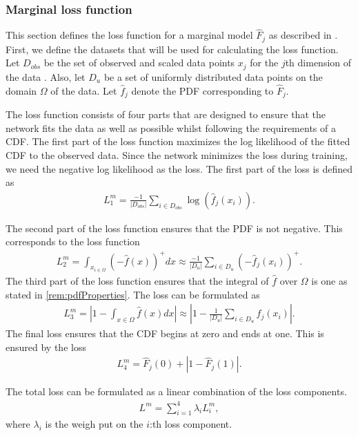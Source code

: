 \subsubsection{Marginal loss function}\label{sec:NeuralMarginalLoss}
This section defines the loss function for a marginal model $\hat{F}_j$ as described in . First, we define the datasets that will be used for calculating the loss function. Let $D_{obs}$ be the set of observed and scaled data points $x_j$ for the $j$th dimension of the data . Also, let $D_u$ be a set of uniformly distributed data points on the domain $\Omega$  of the data. Let $\hat{f}_j$ denote the \gls{PDF} corresponding to $\hat{F}_j$.

The loss function consists of four parts that are designed to ensure that the network fits the data as well as possible whilst following the requirements of a \gls{CDF}. The first part of the loss function maximizes the log likelihood of the fitted \gls{CDF} to the observed data. Since the network minimizes the loss during training, we need the negative log likelihood as the loss. The first part of the loss is defined as 
\begin{align*}
    L_1^m = \frac{-1}{|D_{obs}|} \sum_{i \in D_{obs}} \log(\hat{f}_j(x_i)).
\end{align*}

The second part of the loss function ensures that the \gls{PDF} is not negative. This corresponds to the loss function 
\begin{align*}
    L_2^m = \int_{x_{i\in\Omega}} (-\hat{f}(x))^+dx \approx \frac{-1}{|D_{u}|} \sum_{i \in D_{u}} (-\hat{f}_j(x_i))^+.
\end{align*}
The third part of the loss function ensures that the integral of $\hat{f}$ over $\Omega$ is one as stated in \cref{rem:pdfProperties}. The loss can be formulated as 
\begin{align*}
    L_3^m = \left | 1- \int_{x\in \Omega} \hat{f}(x) dx    \right | \approx \left | 1- \frac{1}{|D_{u}|} \sum_{i \in D_{u}} \hat{f}_j(x_i)  \right |.
\end{align*}
The final loss ensures that the \gls{CDF} begins at zero and ends at one. This is ensured by the loss
\begin{align*}
    L_4^m = \hat{F}_j(0) + |1- \hat{F}_j(1) |.
\end{align*}

The total loss can be formulated as a linear combination of the loss components. 
\begin{align*}
    L^m = \sum_{i=1}^4 \lambda_i L_i^m,
\end{align*}
where $\lambda_i$ is the weigh put on the $i$:th loss component. 

